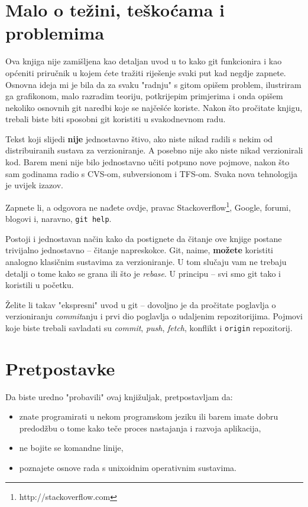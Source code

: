 \section*{Malo o težini, teškoćama i problemima}

Ova knjiga nije zamišljena kao detaljan uvod u to kako git funkcionira i kao općeniti priručnik u kojem ćete tražiti riješenje svaki put kad negdje zapnete.
Osnovna ideja mi je bila da za svaku "radnju" s gitom opišem problem, ilustriram ga grafikonom, malo razradim teoriju, potkrijepim primjerima i onda opišem nekoliko osnovnih git naredbi koje se najčešće koriste.
Nakon što pročitate knjigu, trebali biste biti sposobni git koristiti u svakodnevnom radu. 

Tekst koji slijedi \textbf{nije} jednostavno štivo, ako niste nikad radili s nekim od distribuiranih sustava za verzioniranje.
A posebno nije ako niste nikad verzionirali kod.
Barem meni nije bilo jednostavno učiti potpuno nove pojmove, nakon što sam godinama radio s CVS-om, subversionom i TFS-om.
Svaka nova tehnologija je uvijek izazov.

Zapnete li, a odgovora ne nađete ovdje, pravac Stackoverflow\footnote{http://stackoverflow.com}, Google, 
forumi, blogovi i, naravno, \verb+git help+.

Postoji i jednostavan način kako da postignete da čitanje ove knjige postane trivijalno jednostavno -- čitanje napreskokce.
Git, naime, \textbf{možete} koristiti analogno klasičnim sustavima za verzioniranje. 
U tom slučaju vam ne trebaju detalji o tome kako se grana ili što je \emph{rebase}.
U principu -- svi smo git tako i koristili u početku.

Želite li takav "ekspresni" uvod u git -- dovoljno je da pročitate poglavlja o verzioniranju \emph{commit}anju i prvi dio poglavlja o udaljenim repozitorijima.
Pojmovi koje biste trebali savladati su \emph{commit}, \emph{push}, \emph{fetch}, konflikt i \verb+origin+ repozitorij.

\section*{Pretpostavke}

Da biste uredno "probavili" ovaj knjižuljak, pretpostavljam da:

\begin{itemize}
	\item znate programirati u nekom programskom jeziku ili barem imate dobru predodžbu o tome kako teče proces nastajanja i razvoja aplikacija,
	\item ne bojite se komandne linije,
	\item poznajete osnove rada s unixoidnim operativnim sustavima.
\end{itemize}

